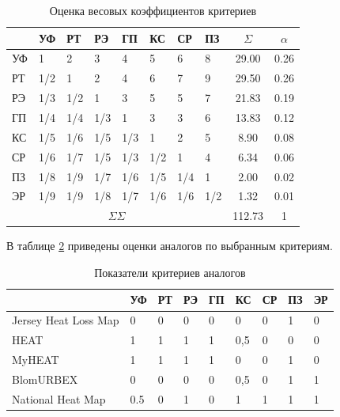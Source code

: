 	\begin{table}
		\begin{center}
			\caption{Оценка весовых коэффициентов критериев}
			\begin{tabular}{ | p{} | l | l | l | l | l | l | l | c | c | }	
				\hline
				   & УФ & РТ & РЭ & ГП & КС & СР & ПЗ & $\Sigma$ & $\alpha$ \\
				\hline
				УФ &1   &2   &3   &4   &5   &6   &8   &29.00 &0.26 \\
				\hline
				РТ &1/2 &1   &2   &4   &6   &7   &9   &29.50 &0.26 \\
				\hline
				РЭ &1/3 &1/2 &1   &3   &5   &5   &7   &21.83 &0.19 \\
				\hline
				ГП &1/4 &1/4 &1/3 &1 &  3   &3   &6   &13.83 &0.12 \\
				\hline
				КС &1/5 &1/6 &1/5 &1/3 &1   &2   &5   &8.90  &0.08 \\
				\hline
				СР &1/6 &1/7 &1/5 &1/3 &1/2 &1   &4   &6.34  &0.06 \\
				\hline
				ПЗ &1/8 &1/9 &1/7 &1/6 &1/5 &1/4 &1   &2.00  &0.02 \\
				\hline
				ЭР &1/9 &1/9 &1/8 &1/7 &1/6 &1/6 &1/2 &1.32  &0.01 \\
				\hline 
				\multicolumn{8}{|c|}{$\Sigma\Sigma$}           &112.73 &1   \\
				\hline
			\end{tabular}
			\label{table:est}
		\end{center}
	\end{table}

	В таблице \ref{table:critval} приведены оценки аналогов по выбранным критериям.

	\begin{table}[h!]
		\begin{center}
			\caption{Показатели критериев аналогов}
			\begin{tabular}{ | p{} | l | l | l | l | l | l | l | l | }	
				\hline
				  	                        &УФ  &РТ &РЭ &ГП &КС  &СР &ПЗ &ЭР \\
				\hline
					Jersey Heat Loss Map 	&0   &0  &0  &0  &0   &0  &1 &0 \\
				\hline
					HEAT 					&1   &1  &1  &1  &0,5 &0  &0 &0 \\
				\hline
					MyHEAT 					&1   &1  &1  &1  &0   &0  &1 &0 \\
				\hline
					BlomURBEX 				&0   &0  &0  &0  &0,5 &0  &1 &1 \\
				\hline
					National Heat Map 		&0.5 &0  &1  &0  &1   &1  &1 &1 \\
				\hline
			\end{tabular}
			\label{table:critval}
		\end{center}
	\end{table}

